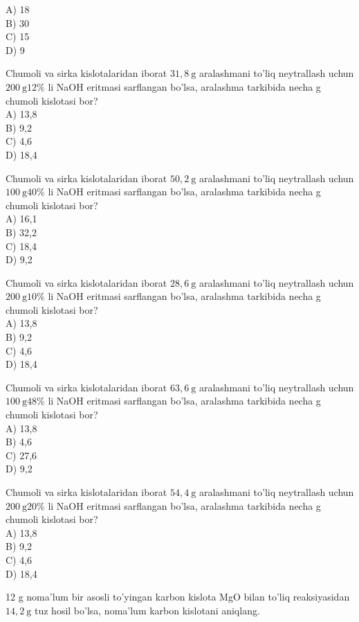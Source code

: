 A) 18\\
B) 30\\
C) 15\\
D) 9
  \item Chumoli va sirka kislotalaridan iborat $31,8 \mathrm{~g}$ aralashmani to'liq neytrallash uchun $200 \mathrm{~g} 12 \%$ li NaOH eritmasi sarflangan bo'lsa, aralashma tarkibida necha g chumoli kislotasi bor?\\
A) 13,8\\
B) 9,2\\
C) 4,6\\
D) 18,4
  \item Chumoli va sirka kislotalaridan iborat $50,2 \mathrm{~g}$ aralashmani to'liq neytrallash uchun $100 \mathrm{~g} 40 \%$ li NaOH eritmasi sarflangan bo'lsa, aralashma tarkibida necha g chumoli kislotasi bor?\\
A) 16,1\\
B) 32,2\\
C) 18,4\\
D) 9,2
  \item Chumoli va sirka kislotalaridan iborat $28,6 \mathrm{~g}$ aralashmani to'liq neytrallash uchun $200 \mathrm{~g} 10 \%$ li NaOH eritmasi sarflangan bo'lsa, aralashma tarkibida necha g chumoli kislotasi bor?\\
A) 13,8\\
B) 9,2\\
C) 4,6\\
D) 18,4
  \item Chumoli va sirka kislotalaridan iborat $63,6 \mathrm{~g}$ aralashmani to'liq neytrallash uchun $100 \mathrm{~g} 48 \%$ li NaOH eritmasi sarflangan bo'lsa, aralashma tarkibida necha g chumoli kislotasi bor?\\
A) 13,8\\
B) 4,6\\
C) 27,6\\
D) 9,2
  \item Chumoli va sirka kislotalaridan iborat $54,4 \mathrm{~g}$ aralashmani to'liq neytrallash uchun $200 \mathrm{~g} 20 \%$ li NaOH eritmasi sarflangan bo'lsa, aralashma tarkibida necha g chumoli kislotasi bor?\\
A) 13,8\\
B) 9,2\\
C) 4,6\\
D) 18,4
  \item 12 g noma'lum bir asosli to'yingan karbon kislota MgO bilan to'liq reaksiyasidan $14,2 \mathrm{~g}$ tuz hosil bo'lsa, noma'lum karbon kislotani aniqlang.\\
